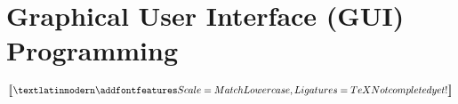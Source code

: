 \chapter{Graphical User Interface (GUI) Programming}
$\big\llbracket \fEn{Not completed yet!} \big\rrbracket$